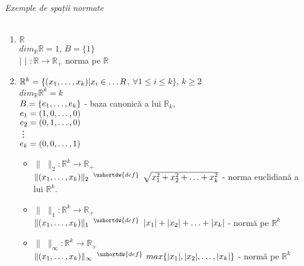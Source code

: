 \part{}

\paragraph{Exemple de spații normate}
\begin{enumerate}[label=\emph{\arabic*})]
	\item $\mathbb{R}$ \\
			  $dim_{\mathbb{R}} \mathbb{R} = 1$, $B = \{ 1 \}$ \\
			  $\lvert $ $ \rvert$ $:\mathbb{R} \rightarrow \mathbb{R}_{+}$ norma pe $\mathbb{R}$
	\item $\mathbb{R}^{k} = \{(x_{1}, \mathellipsis , x_{k}) \vert x_{i} \in \mathellipsis{R}$, $\forall 1 \leq i \leq k \}$, $k \geq 2$ \\
			  $dim_{\mathbb{R}} \mathbb{R}^{k} = k$ \\
			  $B = \{ e_{1}, \mathellipsis, e_{k}\}$ - baza canonică a lui $\mathbb{R}_{k}$, \\
			  $e_{1} = (1, 0, \mathellipsis, 0)$ \\
			  $e_{2} = (0, 1, \mathellipsis, 0)$ \\
			  \vdots \\
			  $e_{k} = (0, 0, \mathellipsis, 1)$ \\
			  \begin{itemize}
				  \item $\lVert$ $\rVert_{2}: \mathbb{R}^{k} \rightarrow \mathbb{R}_{+}$ \\
				        $\lVert (x_{1}, \mathellipsis, x_{k}) \rVert_{2}$ $^{\ushortdw{def}}$ $\sqrt{x_{1}^{2} + x_{2}^{2} + \mathellipsis + x_{k}^{2}}$ - norma euclidiană a lui $\mathbb{R}^{k}$.
				  \item $\lVert$ $\rVert_{1}: \mathbb{R}^{k} \rightarrow \mathbb{R}_{+}$ \\
				        $\lVert (x_{1}, \mathellipsis, x_{k}) \rVert_{1}$ $^{\ushortdw{def}}$ $\lvert x_{1} \rvert + \lvert x_{2} \rvert + \mathellipsis + \lvert x_{k} \rvert$ - normă pe $\mathbb{R}^{k}$
				  \item $\lVert$ $\rVert_{\infty}: \mathbb{R}^{k} \rightarrow \mathbb{R}_{+}$ \\
				        $\lVert (x_{1}, \mathellipsis, x_{k}) \rVert_{\infty}$ $^{\ushortdw{def}}$
						$max\{\lvert x_{1} \rvert , \lvert x_{2} \rvert , \mathellipsis , \lvert x_{k} \rvert\}$ - normă pe $\mathbb{R}^{k}$
			  \end{itemize}
\end{enumerate}

